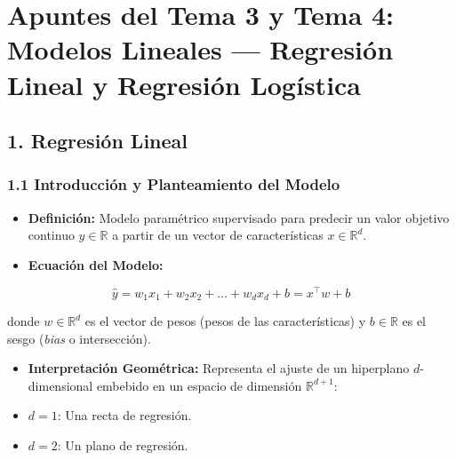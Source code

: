 \documentclass[11pt,oneside]{article}
\begin{document}
\tableofcontents
\clearpage
{}
\section{Apuntes del Tema 3 y Tema 4: Modelos Lineales — Regresión Lineal y Regresión Logística}

\subsection{1. Regresión Lineal}

\subsubsection{1.1 Introducción y Planteamiento del Modelo}

\begin{itemize}

\item \textbf{Definición:} Modelo paramétrico supervisado para predecir un valor objetivo continuo \(y \in \mathbb{R}\) a partir de un vector de características \(x \in \mathbb{R}^d\).

\item \textbf{Ecuación del Modelo:}

\end{itemize}

\[\hat{y} = w_1 x_1 + w_2 x_2 + \dots + w_d x_d + b = x^\top w + b\]

  donde \(w \in \mathbb{R}^d\) es el vector de pesos (pesos de las características) y \(b \in \mathbb{R}\) es el sesgo (\emph{bias} o intersección).

\begin{itemize}

\item \textbf{Interpretación Geométrica:} Representa el ajuste de un hiperplano \(d\)-dimensional embebido en un espacio de dimensión \(\mathbb{R}^{d+1}\):

\item \(d=1\): Una recta de regresión.

\item \(d=2\): Un plano de regresión.

\end{itemize}
\end{document}
